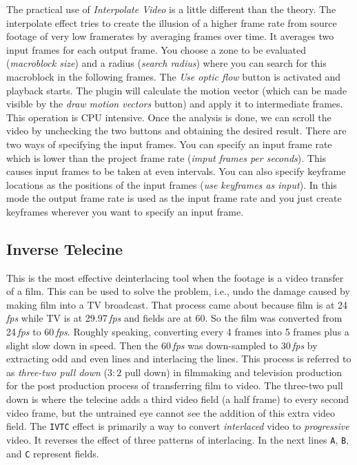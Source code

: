 The practical use of \textit{Interpolate Video} is a little different than the theory. The interpolate effect tries to create the illusion of a higher frame rate from source footage of very low framerates by averaging frames over time. It averages two input frames for each output frame. You choose a zone to be evaluated (\textit{macroblock size}) and a radius (\textit{search radius}) where you can search for this macroblock in the following frames. The \textit{Use optic flow} button is activated and playback starts. The plugin will calculate the motion vector (which can be made visible by the \textit{draw motion vectors} button) and apply it to intermediate frames. This operation is CPU intensive. Once the analysis is done, we can scroll the video by unchecking the two buttons and obtaining the desired result. There are two ways of specifying the input frames. You can specify an input frame rate which is lower than the project frame rate (\textit{imput frames per seconds}). This causes input frames to be taken at even intervals. You can also specify keyframe locations as the positions of the input frames (\textit{use keyframes as input}). In this mode the output frame rate is used as the input frame rate and you just create keyframes wherever you want to specify an input frame.

\subsection{Inverse Telecine}%
\label{sub:inverse_telecine}

This is the most effective deinterlacing tool when the footage is a video transfer of a film. This can be used to solve the problem, i.e., undo the damage caused by making film into a TV broadcast.
That process came about because film is at 24\,\emph{fps} while TV is at 29.97\,\emph{fps} and fields are at 60.
So the film was converted from 24\,\emph{fps} to 60\,\emph{fps}.
Roughly speaking, converting every 4 frames into 5 frames plus a slight slow down in speed.
Then the 60\,\emph{fps} was down-sampled to 30\,\emph{fps} by extracting odd and even lines and interlacing the lines.
This process is referred to as \textit{three-two pull down} ($3:2$ pull down) in filmmaking and television production for the post production process of transferring film to video.
The three-two pull down is where the telecine adds a third video field (a half frame) to every second video frame, but the untrained eye cannot see the addition of this extra video field.
The \texttt{IVTC} effect is primarily a way to convert \textit{interlaced} video to \textit{progressive} video.
It reverses the effect of three patterns of interlacing. In the next lines \texttt{A}, \texttt{B}, and \texttt{C} represent fields.

